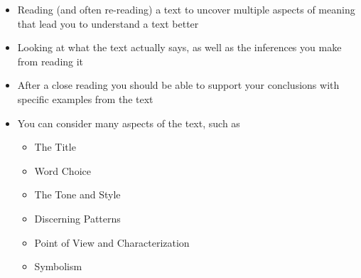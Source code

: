 \documentclass[a4paper,landscape,headrule,footrule,xetex]{foils}
\begin{document}
\begin{itemize}
\item Reading (and often re-reading) a text to uncover multiple
  aspects of meaning that lead you to understand a text better
\item Looking at what the text actually says, as well as the
  inferences you make from reading it
\item After a close reading you should be able to support your
  conclusions with specific examples from the text
\item You can consider many aspects of the text, such as
  \begin{itemize}
  \item The Title
  \item Word Choice
  \item The Tone and Style
  \item Discerning Patterns
  \item  Point of View and Characterization
  \item Symbolism

  \end{itemize}
  \end{itemize}
\end{document}
